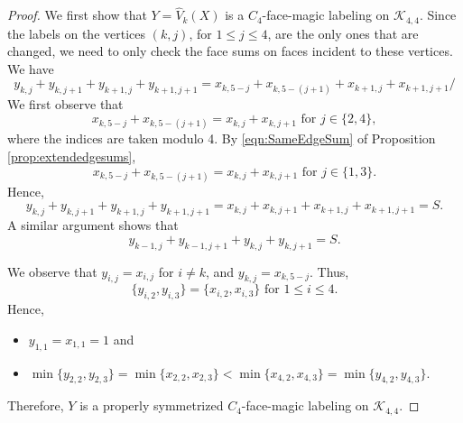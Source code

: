 \documentclass[10pt, reqno]{amsart}
\theoremstyle{definition}
\theoremstyle{plain}
\begin{document}
\begin{proof}
We first show that $Y=\widehat{V}_k(X)$ is a $C_4$-face-magic labeling on $\mathcal{K}_{4,4}$.
Since the labels on the vertices $(k,j)$, for $1\le j\le 4$,
are the only ones that are changed, we need to only check
the face sums on faces incident to these vertices.
We have
\begin{equation*}
    y_{k,j} + y_{k,j+1} + y_{k+1,j} + y_{k+1,j+1}=
    x_{k,5-j} + x_{k,5-(j+1)} + x_{k+1,j} + x_{k+1,j+1}/
\end{equation*}
We first observe that
\begin{equation*}
    x_{k,5-j} + x_{k,5-(j+1)} = x_{k,j} + x_{k,j+1}
    \text{ \ for } j\in\{2,4\},
\end{equation*}
where the indices are taken modulo 4.
By \eqref{eqn:SameEdgeSum} of Proposition \ref{prop:extendedgesums},
\begin{equation*}
    x_{k,5-j} + x_{k,5-(j+1)} = x_{k,j} + x_{k,j+1}
    \text{ \ for } j\in\{1,3\}.
\end{equation*}
Hence,
\begin{equation*}
    y_{k,j} + y_{k,j+1} + y_{k+1,j} + y_{k+1,j+1}=
    x_{k,j} + x_{k,j+1} + x_{k+1,j} + x_{k+1,j+1}=S.
\end{equation*}
A similar argument shows that
\begin{equation*}
    y_{k-1,j} + y_{k-1,j+1} + y_{k,j} + y_{k,j+1}=S.
    \end{equation*}

    We observe that $y_{i,j}=x_{i,j}$ for $i\ne k$, and $y_{k,j}=x_{k,5-j}$. Thus,
    \begin{equation*}
        \{y_{i,2}, y_{i,3}\}=\{ x_{i,2}, x_{i,3}\}
 \text{ \ for } 1\le i \le 4.    \end{equation*}
    Hence, 
    \begin{itemize}
        \item $y_{1,1}=x_{1,1}=1$ and
        \item $\min\{y_{2,2},y_{2,3}\} = \min\{x_{2,2},x_{2,3}\}
        < \min\{x_{4,2},x_{4,3}\} = \min\{y_{4,2},y_{4,3}\}$.
    \end{itemize}
    Therefore, $Y$ is a properly symmetrized $C_4$-face-magic
    labeling on $\mathcal{K}_{4,4}$.


\end{proof}
\end{document}
